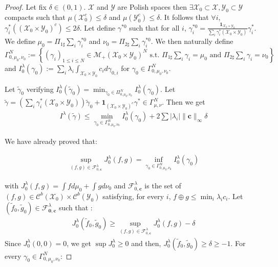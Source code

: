 \begin{proof}
Let fix $\delta\in (0,1)$. $\mathcal{X}$ and $\mathcal{Y}$ are Polish spaces then $\exists  \mathcal{X}_0\subset \mathcal{X},  \mathcal{Y}_0\subset \mathcal{Y}$ compacts such that $\mu(\mathcal{X}_0^c) \leq  \delta$ and $\mu(\mathcal{Y}_0^c) \leq  \delta$.  It follows that $\forall i$, $\gamma^*_i((\mathcal{X}_0\times\mathcal{Y}_0)^c)\leq 2\delta$. Let define $\gamma^{*0}$ such that for all $i$, $\gamma^{*0}_{i}=\frac{\mathbf{1}_{\mathcal{X}_0\times\mathcal{Y}_0}}{\sum_i\gamma_i
^*(\mathcal{X}_0\times\mathcal{Y}_0)}\gamma^*_i$. We define $\mu_0 = \Pi_{1\sharp}\sum_i\gamma_{i}^{*0}$ and  $\nu_0 = \Pi_{2\sharp}\sum_i\gamma_{i}^{*0}$. We then naturally define $\Gamma^{N}_{0,\mu_0,\nu_0} :=\left\{(\gamma_i)_{1\leq i\leq N}\in \mathcal{M}_+(\mathcal{X}_0\times \mathcal{Y}_0)^N\text{ s.t. } \Pi_{1\sharp}\sum_i\gamma_i=\mu_0 \text{ and } \Pi_{2\sharp}\sum_i\gamma_i=\nu_0\right\}$ and $I^\lambda_0(\gamma_0) := \sum_i\lambda_i\int_{\mathcal{X}_0\times\mathcal{Y}_0}c_id\gamma_{0,i}$ for $\gamma_0\in\Gamma^{N}_{0,\mu_0,\nu_0}$. 

Let $\tilde{\gamma}_0$ verifying  $I^\lambda_0(\tilde{\gamma}_0) = \min_{\gamma_0\in\Pi^N_{0,\mu_0,\nu_0}}I^\lambda_0(\gamma_0)$. Let $\tilde{\gamma} = \left(\sum_i\gamma_i^*(\mathcal{X}_0\times\mathcal{Y}_0)\right)\tilde{\gamma}_0+\mathbf{1}_{(\mathcal{X}_0\times\mathcal{Y}_0)^c}\gamma^*\in \Gamma^N_{\mu,\nu}$. Then we get 
\begin{align*}
I^\lambda(\tilde{\gamma})\leq \min_{\gamma_0\in\Gamma^N_{0,\mu_0,\nu_0}}I^\lambda_0(\gamma_0)+2\sum|\lambda_i|\lVert \mathbf{c}\rVert_\infty\delta
\end{align*}

We have already proved that:

\begin{align*}
\sup\limits_{(f,g)\in\mathcal{F}^\lambda_{0,\mathbf{c}}}J_0^\lambda(f,g) = \inf\limits_{\gamma_0\in\Gamma^N_{0,\mu_0,\nu_0}}I_0^\lambda(\gamma_0)
\end{align*}

with $J_0^\lambda(f,g) = \int fd\mu_0+\int gd\nu_0$ and $\mathcal{F}^\lambda_{0,\mathbf{c}}$ is the set of $(f,g)\in\mathcal{C}^b(\mathcal{X}_0)\times \mathcal{C}^b(\mathcal{Y}_0)$ satisfying, for every $i$, $f\oplus g\leq\min_i\lambda_i c_i$. Let $(\tilde{f}_0,\tilde{g}_0)\in \mathcal{F}^\lambda_\mathbf{0,c}$ such that :
\begin{align*}
    J_0^\lambda(\tilde{f}_0,\tilde{g}_0)\geq \sup\limits_{(f,g)\in\mathcal{F}^\lambda_{0,\mathbf{c}}}J_0^\lambda(f,g)-\delta
\end{align*}
Since $J_0^\lambda(0,0)=0$, we get $\sup J_0^\lambda\geq 0$ and then,  $J_0^\lambda(\tilde{f}_0,\tilde{g}_0)\geq \delta\geq-1$. For every $\gamma_0 \in \Gamma^N_{0,\mu_0,\nu_0}$:


\end{proof}
